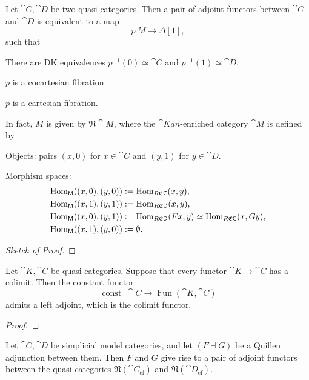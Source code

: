 \begin{proposition}
    Let $\cat C,\cat D$ be two quasi-categories.
    Then a pair of adjoint functors between $\cat C$ and $\cat D$
    is equivalent to a map 
    \[ p\:M\to\Delta[1], \]
    such that 
    \begin{itms}
        \item There are DK equivalences
        $p^{-1}(0)\simeq\cat C$ and $p^{-1}(1)\simeq\cat D$.
        \item $p$ is a cocartesian fibration.
        \item $p$ is a cartesian fibration.
    \end{itms}
    In fact, $M$ is given by $\mathfrak N\cat M$,
    where the $\cat{Kan}$-enriched category $\cat M$ is defined by 
    \begin{itms}
        \item Objects: pairs $(x,0)$ for $x\in\cat C$ and $(y,1)$ for $y\in\cat D$.
        \item Morphism spaces:
        \[ \begin{aligned}
            \operatorname{Hom}_{\mathsf{M}}((x,0),(y,0)) &:= \operatorname{Hom}_{R\mathfrak C\mathsf{C}}(x,y), \\
            \operatorname{Hom}_{\mathsf{M}}((x,1),(y,1)) &:= \operatorname{Hom}_{R\mathfrak C\mathsf{D}}(x,y), \\
            \operatorname{Hom}_{\mathsf{M}}((x,0),(y,1)) &:= \operatorname{Hom}_{R\mathfrak C\mathsf{D}}(Fx,y)\simeq\operatorname{Hom}_{R\mathfrak C\mathsf{C}}(x,Gy), \\
            \operatorname{Hom}_{\mathsf{M}}((x,1),(y,0)) &:= \emptyset.
        \end{aligned} \]
    \end{itms}
\end{proposition}

\begin{proof}[Sketch of Proof]
    \nyw
\end{proof}

\begin{proposition}
    Let $\cat K,\cat C$ be quasi-categories.
    Suppose that every functor $\cat K\to\cat C$ has a colimit.
    Then the constant functor 
    \[ \operatorname{const}\:\cat C\to\operatorname{Fun}(\cat K,\cat C) \]
    admits a left adjoint, which is the colimit functor.
\end{proposition}

\begin{proof}
    \nyw
\end{proof}

\begin{remark}
    Let $\cat C,\cat D$ be simplicial model categories,
    and let $(F\dashv G)$ be a Quillen adjunction between them.
    Then $F$ and $G$ give rise to 
    a pair of adjoint functors between the quasi-categories
    $\mathfrak N(\cat C_{\mathrm{cf}})$ and
    $\mathfrak N(\cat D_{\mathrm{cf}})$. \varqed
\end{remark}
